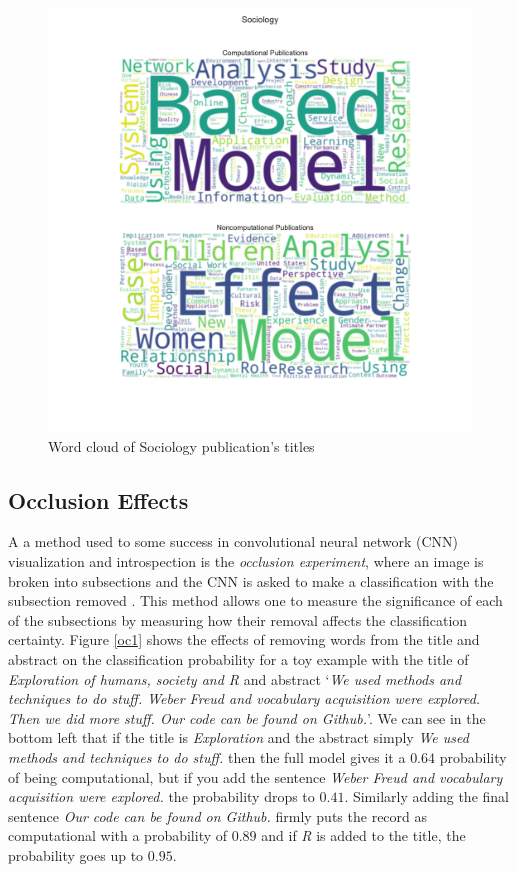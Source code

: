 \documentclass[12pt, a4paper]{article}
\begin{document}
\begin{figure}[H]
	\centering
	\includegraphics[width=\textwidth]{wc_Sociology}
	\caption{Word cloud of Sociology publication's titles}\label{wc}
\end{figure}

\subsection{Occlusion Effects}

A a method used to some success in convolutional neural network (CNN) visualization and introspection is the \textit{occlusion experiment}, where an image is broken into subsections and the CNN is asked to make a classification with the subsection removed \citep{zeiler2014visualizing}. This method allows one to measure the significance of each of the subsections by measuring how their removal affects the classification certainty. Figure \ref{oc1} shows the effects of removing words from the title and abstract on the classification probability for a toy example with the title of \textit{Exploration of humans, society and R} and abstract `\textit{We used methods and techniques to do stuff. Weber Freud and vocabulary acquisition were explored. Then we did more stuff. Our code can be found on Github.}'. We can see in the bottom left that if the title is \textit{Exploration} and the abstract simply \textit{We used methods and techniques to do stuff.} then the full model gives it a $0.64$ probability of being computational, but if you add the sentence \textit{Weber Freud and vocabulary acquisition were explored.} the probability drops to $0.41$. Similarly adding the final sentence \textit{Our code can be found on Github.} firmly puts the record as computational with a probability of $0.89$ and if \textit{R} is added to the title, the probability goes up to $0.95$.
\end{document}
